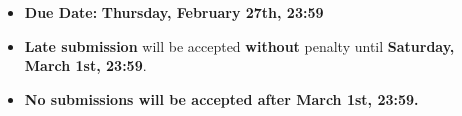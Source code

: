 \documentclass[11pt]{article}
\begin{document}
    \setlength{\headheight}{26pt}
    \pagestyle{fancy}
    \fancyfoot[C]{}
    \fancyfoot[R]{\thepage}
    \renewcommand{\headrulewidth}{0.4pt}
    \renewcommand{\footrulewidth}{0.4pt}
    
    
    \begin{itemize}
    \item \textbf{Due Date:} \textbf{Thursday, February 27th, 23:59}
    \item \textbf{Late submission} will be accepted \textbf{without} penalty until \textbf{Saturday, March 1st, 23:59}.
    \item \textbf{No submissions will be accepted after March 1st, 23:59.}
    \end{itemize}
\end{document}
